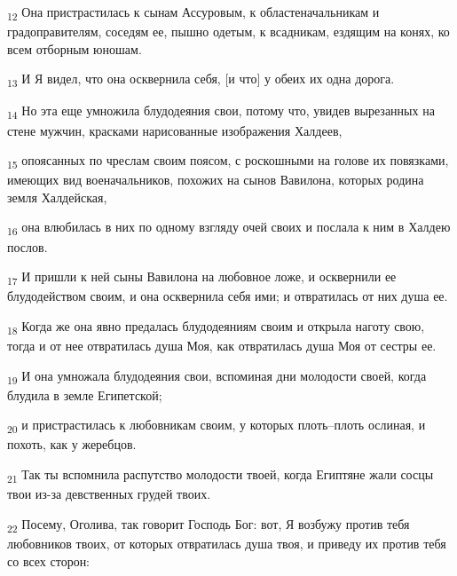 \begin{tcolorbox}
\textsubscript{12} Она пристрастилась к сынам Ассуровым, к областеначальникам и градоправителям, соседям ее, пышно одетым, к всадникам, ездящим на конях, ко всем отборным юношам.
\end{tcolorbox}
\begin{tcolorbox}
\textsubscript{13} И Я видел, что она осквернила себя, [и что] у обеих их одна дорога.
\end{tcolorbox}
\begin{tcolorbox}
\textsubscript{14} Но эта еще умножила блудодеяния свои, потому что, увидев вырезанных на стене мужчин, красками нарисованные изображения Халдеев,
\end{tcolorbox}
\begin{tcolorbox}
\textsubscript{15} опоясанных по чреслам своим поясом, с роскошными на голове их повязками, имеющих вид военачальников, похожих на сынов Вавилона, которых родина земля Халдейская,
\end{tcolorbox}
\begin{tcolorbox}
\textsubscript{16} она влюбилась в них по одному взгляду очей своих и послала к ним в Халдею послов.
\end{tcolorbox}
\begin{tcolorbox}
\textsubscript{17} И пришли к ней сыны Вавилона на любовное ложе, и осквернили ее блудодейством своим, и она осквернила себя ими; и отвратилась от них душа ее.
\end{tcolorbox}
\begin{tcolorbox}
\textsubscript{18} Когда же она явно предалась блудодеяниям своим и открыла наготу свою, тогда и от нее отвратилась душа Моя, как отвратилась душа Моя от сестры ее.
\end{tcolorbox}
\begin{tcolorbox}
\textsubscript{19} И она умножала блудодеяния свои, вспоминая дни молодости своей, когда блудила в земле Египетской;
\end{tcolorbox}
\begin{tcolorbox}
\textsubscript{20} и пристрастилась к любовникам своим, у которых плоть--плоть ослиная, и похоть, как у жеребцов.
\end{tcolorbox}
\begin{tcolorbox}
\textsubscript{21} Так ты вспомнила распутство молодости твоей, когда Египтяне жали сосцы твои из-за девственных грудей твоих.
\end{tcolorbox}
\begin{tcolorbox}
\textsubscript{22} Посему, Оголива, так говорит Господь Бог: вот, Я возбужу против тебя любовников твоих, от которых отвратилась душа твоя, и приведу их против тебя со всех сторон:
\end{tcolorbox}
